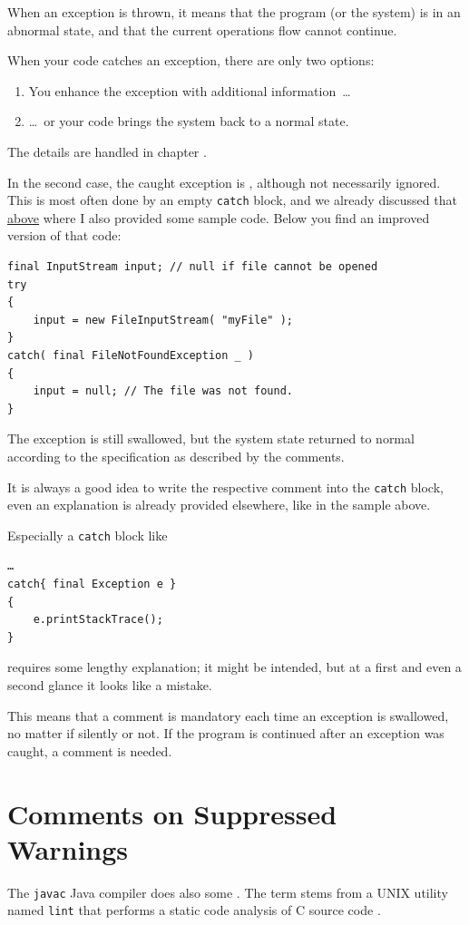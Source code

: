 When an exception is thrown, it means that the program (or the system) is in an abnormal state, and that the current operations flow cannot continue.

When your code catches an exception, there are only two options:
\begin{enumerate}
	\item{You enhance the exception with additional information~…}
	\item{…~or your code brings the system back to a normal state.}
\end{enumerate}
The details are handled in chapter .

In the second case, the caught exception is , although not necessarily ignored. This is most often done by an empty \lstinline|catch| block, and we already discussed that \hyperref[lbl:SwallowException]{above} where I also provided some sample code. Below you find an improved version of that code:

\begin{lstlisting}
final InputStream input; // null if file cannot be opened
try
{
    input = new FileInputStream( "myFile" );
}
catch( final FileNotFoundException _ ) 
{ 
    input = null; // The file was not found.
}
\end{lstlisting}
The exception is still swallowed, but the system state returned to normal according to the specification as described by the comments.

It is always a good idea to write the respective comment into the \lstinline|catch| block, even an explanation is already provided elsewhere, like in the sample above.

Especially a \lstinline|catch| block like 
\begin{lstlisting}
…
catch{ final Exception e }
{
    e.printStackTrace();
}    
\end{lstlisting}
requires some lengthy explanation; it might be intended, but at a first and even a second glance it looks like a mistake. 

This means that a comment is mandatory each time an exception is swallowed, no matter if silently or not. If the program is continued after an exception was caught, a comment is needed.


\section{Comments on Suppressed Warnings}
The \texttt{javac} Java compiler does also some . The term stems from a UNIX utility named \texttt{lint} that performs a static code analysis of C source code \autocite{WIKIPEDIA:lint}. 

